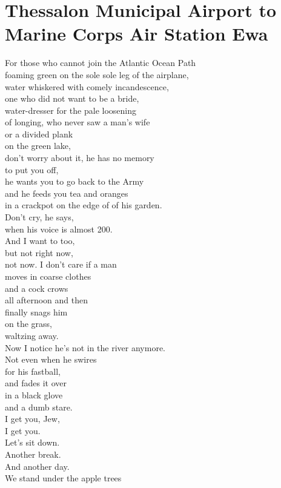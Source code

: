 \documentclass[smalldemyvopaper,11pt,twoside,onecolumn,openright,extrafontsizes]{memoir}
\begin{document}
\chapter{Thessalon Municipal Airport to Marine Corps Air Station Ewa}
For those who cannot join the Atlantic Ocean Path
\\foaming green on the sole sole leg of the airplane,
\\water whiskered with comely incandescence,
\\one who did not want to be a bride,
\\water-dresser for the pale loosening
\\of longing, who never saw a man's wife
\\or a divided plank
\\on the green lake,
\\don't worry about it, he has no memory
\\to put you off,
\\he wants you to go back to the Army
\\and he feeds you tea and oranges
\\in a crackpot on the edge of of his garden.
\\Don't cry, he says,
\\when his voice is almost 200.
\\And I want to too,
\\but not right now,
\\not now. I don't care if a man
\\moves in coarse clothes
\\and a cock crows
\\all afternoon and then
\\finally snags him
\\on the grass,
\\waltzing away.
\\Now I notice he's not in the river anymore.
\\Not even when he swires
\\for his fastball,
\\and fades it over
\\in a black glove
\\and a dumb stare.
\\I get you, Jew,
\\I get you.
\\Let's sit down.
\\Another break.
\\And another day.
\\We stand under the apple trees
\end{document}
